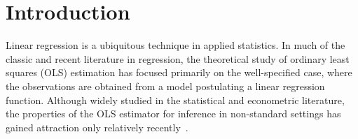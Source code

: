 \documentclass[11pt]{article}
\begin{document}









\section{Introduction}
Linear regression is a ubiquitous technique in applied statistics. In much of the classic and recent literature in regression, the theoretical study of ordinary least squares (OLS) estimation has focused primarily on the well-specified case, where the observations are obtained from a model postulating a linear regression function. Although widely studied in the statistical and econometric literature, the properties of the OLS estimator for inference in non-standard settings has gained attraction only relatively recently~\citep{Buja14,Buja16,Uniform:Kuch18}.
\end{document}
